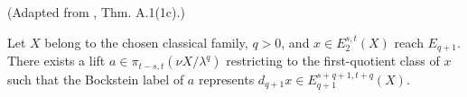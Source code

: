 \begin{theorem}
\label{frontier:Literature:98ed1948c077}
(Adapted from \cite{BHS}, Thm. A.1(1c).)\par{}

Let $X$ belong to the chosen classical family, $q>0$, and $x\in E_2^{s,t}(X)$ reach $E_{q+1}$. There exists a lift $a\in\pi_{t-s,t}(\nu X/\lambda^q)$ restricting to the first-quotient class of $x$ such that the Bockstein label of $a$ represents $d_{q+1}x\in E_{q+1}^{s+q+1,t+q}(X)$.
\end{theorem}




